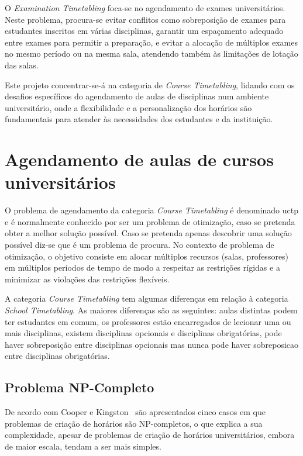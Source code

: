 O \textit{Examination Timetabling} foca-se no agendamento de exames universitários. Neste problema, procura-se evitar conflitos como sobreposição de exames para estudantes inscritos em várias disciplinas, garantir um espaçamento adequado entre exames para permitir a preparação, e evitar a alocação de múltiplos exames no mesmo período ou na mesma sala, atendendo também às limitações de lotação das salas.

Este projeto concentrar-se-á na categoria de \textit{Course Timetabling}, lidando com os desafios específicos do agendamento de aulas de disciplinas num ambiente universitário, onde a flexibilidade e a personalização dos horários são fundamentais para atender às necessidades dos estudantes e da instituição.

\newpage %

\section{Agendamento de aulas de cursos universitários}
\label{capitulo2:Course-timetabling}

O problema de agendamento da categoria \textit{Course Timetabling} é denominado \gls{uctp} e é normalmente conhecido por ser um problema de otimização, caso se pretenda obter a melhor solução possível. Caso se pretenda apenas descobrir uma solução possível diz-se que é um problema de procura. No contexto de problema de otimização, o objetivo consiste em alocar múltiplos recursos (salas, professores) em múltiplos períodos de tempo de modo a respeitar as restrições rígidas e a minimizar as violações das restrições flexíveis.

A categoria \textit{Course Timetabling} tem algumas diferenças em relação à categoria \textit{School Timetabling}. As maiores diferenças são as seguintes: aulas distintas podem ter estudantes em comum, os professores estão encarregados de lecionar uma ou mais disciplinas, existem disciplinas opcionais e disciplinas obrigatórias, pode haver sobreposição entre disciplinas opcionais mas nunca pode haver sobreposicao entre disciplinas obrigatórias.

\subsection{Problema NP-Completo}

De acordo com Cooper e Kingston~\cite{complexitytimetableconstruction-Cooper-1996} são apresentados cinco casos em que problemas de criação de horários são NP-completos, o que explica a sua complexidade, apesar de problemas de criação de horários universitários, embora de maior escala, tendam a ser mais simples.

